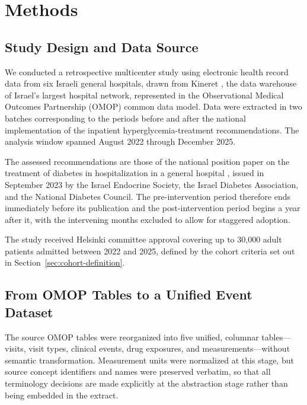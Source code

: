 \section{Methods}
\label{sec:methods}

\subsection{Study Design and Data Source}

We conducted a retrospective multicenter study using electronic health
record data from six Israeli general hospitals, drawn from Kineret
\citep{rappoport2025kineret}, the
data warehouse of Israel's largest hospital network, represented in the
Observational Medical Outcomes Partnership (OMOP) common data model. Data
were extracted in two batches corresponding to the periods before and after
the national implementation of the inpatient hyperglycemia-treatment
recommendations. The analysis window spanned August 2022 through December
2025.

The assessed recommendations are those of the national position paper on
the treatment of diabetes in hospitalization in a general hospital
\citep{hochberg2023inpatient}, issued in September 2023 by the Israel
Endocrine Society, the Israel Diabetes Association, and the National
Diabetes Council. The pre-intervention period therefore ends immediately
before its publication and the post-intervention period begins a year after
it, with the intervening months excluded to allow for staggered adoption.

The study received Helsinki committee approval covering up to 30,000 adult
patients admitted between 2022 and 2025, defined by the cohort criteria set
out in Section~\ref{sec:cohort-definition}.

\subsection{From OMOP Tables to a Unified Event Dataset}

The source OMOP tables were reorganized into five unified, columnar
tables---visits, visit types, clinical events, drug exposures, and
measurements---without semantic transformation. Measurement units were
normalized at this stage, but source concept identifiers and names were
preserved verbatim, so that all terminology decisions are made explicitly at
the abstraction stage rather than being embedded in the extract.

